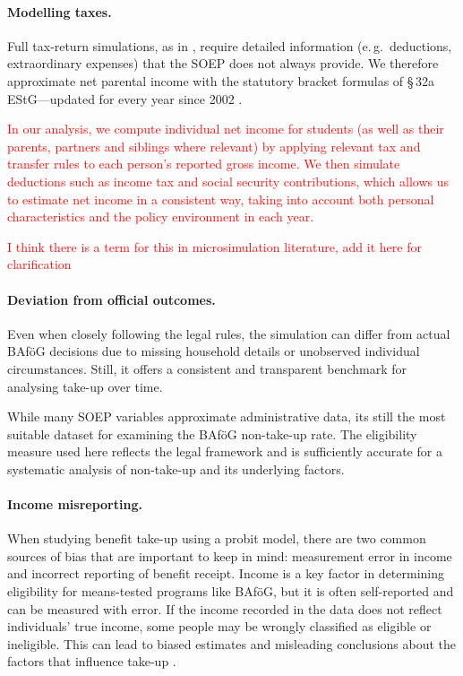 \paragraph{Modelling taxes.}
Full tax‑return simulations, as in \cite{herber_non-take-up_2019}, require detailed information (e.\,g.\ deductions, extraordinary expenses) that the SOEP does not always provide.  
We therefore approximate net parental income with the statutory bracket formulas of §\,32a EStG—updated for every year since 2002 \citep{estg_law,estg_2025,estg_2024,estg_2023,estg_2022,estg_2021,estg_2020,estg_2019,estg_2018,estg_2017,estg_2016,estg_2015,estg_2014,estg_2013,estg_2012,estg_2007,estg_2006,estg_lohninfo_2012}.  

\textcolor{red}{In our analysis, we compute individual net income for students (as well as their parents, partners and siblings where relevant) by applying relevant tax and transfer rules to each person’s reported gross income. We then simulate deductions such as income tax and social security contributions, which allows us to estimate net income in a consistent way, taking into account both personal characteristics and the policy environment in each year.}

\textcolor{red}{I think there is a term for this in microsimulation literature, add it here for clarification}

\paragraph{Deviation from official outcomes.}
Even when closely following the legal rules, the simulation can differ from actual BAföG decisions due to missing household details or unobserved individual circumstances. 
Still, it offers a consistent and transparent benchmark for analysing take-up over time.

While many SOEP variables approximate administrative data, its still the most suitable dataset for examining the BAföG non-take-up rate. 
The eligibility measure used here reflects the legal framework and is sufficiently accurate for a systematic analysis of non-take-up and its underlying factors.


\paragraph{Income misreporting.}
When studying benefit take-up using a probit model, there are two common sources of bias that are important to keep in mind: measurement error in income and incorrect reporting of benefit receipt. Income is a key factor in determining eligibility for means-tested programs like BAföG, but it is often self-reported and can be measured with error. If the income recorded in the data does not reflect individuals' true income, some people may be wrongly classified as eligible or ineligible. This can lead to biased estimates and misleading conclusions about the factors that influence take-up \citep{pudney_impact_2001}.

